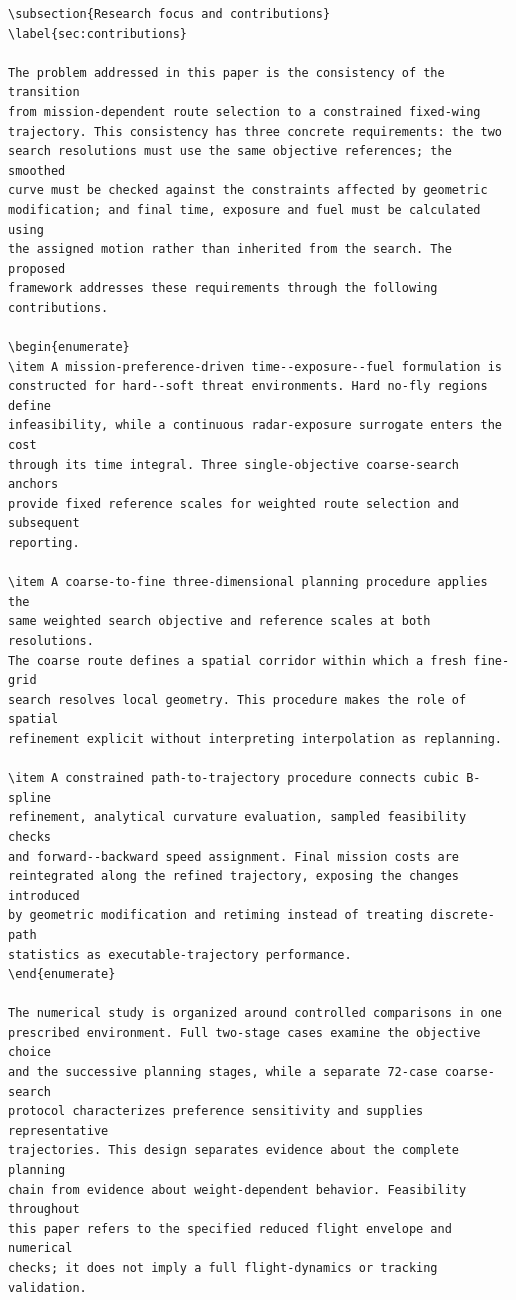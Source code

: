 \documentclass[12pt]{article}
\begin{document}
\begin{verbatim}
\subsection{Research focus and contributions}
\label{sec:contributions}

The problem addressed in this paper is the consistency of the transition
from mission-dependent route selection to a constrained fixed-wing
trajectory. This consistency has three concrete requirements: the two
search resolutions must use the same objective references; the smoothed
curve must be checked against the constraints affected by geometric
modification; and final time, exposure and fuel must be calculated using
the assigned motion rather than inherited from the search. The proposed
framework addresses these requirements through the following contributions.

\begin{enumerate}
\item A mission-preference-driven time--exposure--fuel formulation is
constructed for hard--soft threat environments. Hard no-fly regions define
infeasibility, while a continuous radar-exposure surrogate enters the cost
through its time integral. Three single-objective coarse-search anchors
provide fixed reference scales for weighted route selection and subsequent
reporting.

\item A coarse-to-fine three-dimensional planning procedure applies the
same weighted search objective and reference scales at both resolutions.
The coarse route defines a spatial corridor within which a fresh fine-grid
search resolves local geometry. This procedure makes the role of spatial
refinement explicit without interpreting interpolation as replanning.

\item A constrained path-to-trajectory procedure connects cubic B-spline
refinement, analytical curvature evaluation, sampled feasibility checks
and forward--backward speed assignment. Final mission costs are
reintegrated along the refined trajectory, exposing the changes introduced
by geometric modification and retiming instead of treating discrete-path
statistics as executable-trajectory performance.
\end{enumerate}

The numerical study is organized around controlled comparisons in one
prescribed environment. Full two-stage cases examine the objective choice
and the successive planning stages, while a separate 72-case coarse-search
protocol characterizes preference sensitivity and supplies representative
trajectories. This design separates evidence about the complete planning
chain from evidence about weight-dependent behavior. Feasibility throughout
this paper refers to the specified reduced flight envelope and numerical
checks; it does not imply a full flight-dynamics or tracking validation.


\end{verbatim}
\end{document}
